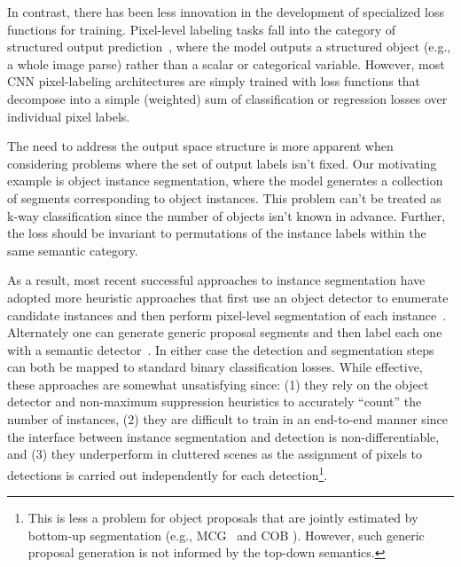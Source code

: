 \documentclass[10pt,twocolumn,letterpaper]{article}
\begin{document}
In contrast, there has been less innovation in the development of specialized
loss functions for training. Pixel-level labeling tasks fall into the category
of structured output prediction~\cite{bakir2007predicting}, where the model
outputs a structured object (e.g., a whole image parse) rather than a scalar or
categorical variable.  However, most CNN pixel-labeling architectures are
simply trained with loss functions that decompose into a simple (weighted) sum
of classification or regression losses over individual pixel labels.

The need to address the output space structure is more apparent when
considering problems where the set of output labels isn't fixed.  Our
motivating example is object instance segmentation, where the model generates a
collection of segments corresponding to object instances.  This problem
can't be treated as k-way classification since the number of objects isn't
known in advance.  Further, the loss should be invariant to permutations of
the instance labels within the same semantic category.

As a result, most recent successful approaches to instance segmentation have
adopted more heuristic approaches that first use an object detector to
enumerate candidate instances and then perform pixel-level segmentation of each
instance~\cite{liang2015proposal, dai2016instance, li2016fully,
liang2016reversible, arnab2017pixelwise}.  Alternately one can generate generic
proposal segments and then label each one with a semantic
detector~\cite{hariharan2014simultaneous, chen2015multi,
hariharan2015hypercolumns, dai2015convolutional, uhrig2016pixel, he2017mask}.
In either case the detection and segmentation steps can both be mapped to
standard binary classification losses.  While effective, these approaches are
somewhat unsatisfying since: (1) they rely on the object detector and
non-maximum suppression heuristics to accurately ``count'' the number of
instances, (2) they are difficult to train in an end-to-end manner since the
interface between instance segmentation and detection is non-differentiable,
and (3) they underperform in cluttered scenes as the assignment of pixels to
detections is carried out independently for each detection\footnote{This is
less a problem for object proposals that are jointly estimated by bottom-up
segmentation (e.g., MCG~\cite{pont2017multiscale} and COB
\cite{maninis2017convolutional}).  However, such generic proposal generation is
not informed by the top-down semantics.}.
\end{document}
